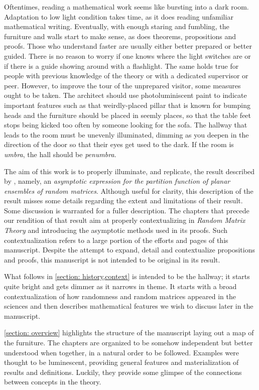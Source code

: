 Oftentimes, reading a mathematical work seems like bursting into a dark room. Adaptation to low light condition takes time, as it does reading unfamiliar mathematical writing. Eventually, with enough staring and fumbling, the furniture and walls start to make sense, as does theorems, propositions and proofs. Those who understand faster are usually either better prepared or better guided. There is no reason to worry if one knows where the light switches are or if there is a guide showing around with a flashlight. The same holds true for people with previous knowledge of the theory or with a dedicated supervisor or peer. However, to improve the tour of the unprepared visitor, some measures ought to be taken. The architect should use photoluminiscent paint to indicate important features such as that weirdly-placed pillar that is known for bumping heads and the furniture should be placed in seemly places, so that the table feet stops being kicked too often by someone looking for the sofa. The hallway that leads to the room must be unevenly illuminated, dimming as you deepen in the direction of the door so that their eyes get used to the dark. If the room is \textit{umbra}, the hall should be \textit{penumbra}. 

The aim of this work is to properly illuminate, and replicate, the result described by , namely, an \textit{asymptotic expression for the partition function of planar ensembles of random matrices}. Although useful for clarity, this description of the result misses some details regarding the extent and limitations of their result. Some discussion is warranted for a fuller description. The chapters that precede our rendition of that result aim at properly contextualizing in \textit{Random Matrix Theory} and introducing the asymptotic methods used in its proofs. Such contextualization refers to a large portion of the efforts and pages of this manuscript. Despite the attempt to expand, detail and contextualize propositions and proofs, this manuscript is not intended to be original in its result.

What follows in \autoref{section: history,context} is intended to be the hallway; it starts quite bright and gets dimmer as it narrows in theme. It starts with a broad contextualization of how randomness and random matrices appeared in the sciences and then describes mathematical features we wish to discuss later in the manuscript. 

\autoref{section: overview} highlights the structure of the manuscript laying out a map of the furniture. The chapters are organized to be somehow independent but better understood when together, in a natural order to be followed. Examples were thought to be luminescent, providing general features and materialization of results and definitions. Luckily, they provide some glimpse of the connections between concepts in the theory.


